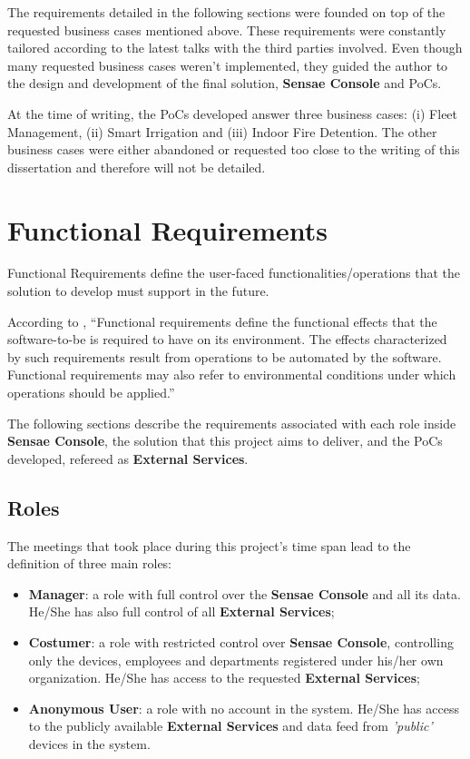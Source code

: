 The requirements detailed in the following sections were founded on top of the requested business cases mentioned above. These requirements were constantly tailored according to the latest talks with the third parties involved. Even though many requested business cases weren't implemented, they guided the author to the design and development of the final solution, \textbf{Sensae Console} and \gls{PoC}s.

At the time of writing, the \gls{PoC}s developed answer three business cases: (i) Fleet Management, (ii) Smart Irrigation and (iii) Indoor Fire Detention. The other business cases were either abandoned or requested too close to the writing of this dissertation and therefore will not be detailed.

\section{Functional Requirements}
\label{sec:requirements:functional}

Functional Requirements define the user-faced functionalities/operations that the solution to develop must support in the future.

According to \cite{van2009requirements}, ``Functional requirements define the functional effects that the software-to-be is required to have on its environment. The effects characterized by such requirements result from operations to be automated by the software. Functional requirements may also refer to environmental conditions under which operations should be applied.''

The following sections describe the requirements associated with each role inside \textbf{Sensae Console}, the solution that this project aims to deliver, and the \gls{PoC}s developed, refereed as \textbf{External Services}.

\subsection{Roles}
\label{subsec:requirements:functional:roles}

The meetings that took place during this project's time span lead to the definition of three main roles:

\begin{itemize}
    \item \textbf{Manager}: a role with full control over the \textbf{Sensae Console} and all its data. He/She has also full control of all \textbf{External Services};
    \item \textbf{Costumer}: a role with restricted control over \textbf{Sensae Console}, controlling only the devices, employees and departments registered under his/her own organization. He/She has access to the requested \textbf{External Services};
    \item \textbf{Anonymous User}: a role with no account in the system. He/She has access to the publicly available \textbf{External Services} and data feed from \textit{'public'} devices in the system.
\end{itemize}

